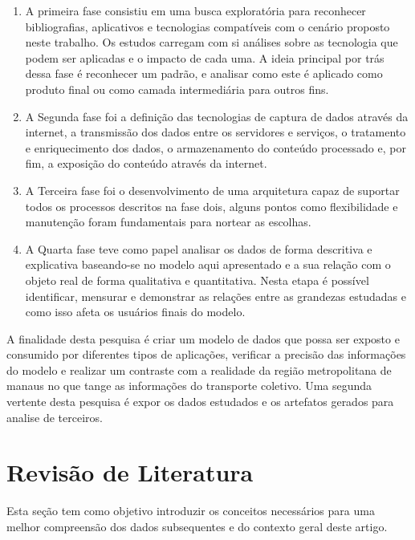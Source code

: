 \documentclass[12pt]{article}
\begin{document}
\begin{enumerate}
\item A primeira fase consistiu em uma busca exploratória para reconhecer bibliografias, aplicativos e tecnologias compatíveis com o cenário proposto neste trabalho. Os estudos carregam com si análises sobre as tecnologia que podem ser aplicadas e o impacto de cada uma. A ideia principal por trás dessa fase é reconhecer um padrão, e analisar como este é aplicado como produto final ou como camada intermediária para outros fins.\\

\item A Segunda fase foi a definição das tecnologias de captura de dados através da internet, a transmissão dos dados entre os servidores e serviços, o tratamento e enriquecimento dos dados, o armazenamento do conteúdo processado e, por fim, a exposição do conteúdo através da internet.\\

\item A Terceira fase foi o desenvolvimento de uma arquitetura capaz de suportar todos os processos descritos na fase dois, alguns pontos como flexibilidade e manutenção foram fundamentais para nortear as escolhas.\\

\item A Quarta fase teve como papel analisar os dados de forma descritiva e explicativa baseando-se no modelo aqui apresentado e a sua relação com o objeto real de forma qualitativa e quantitativa. Nesta etapa é possível identificar, mensurar e demonstrar as relações entre as grandezas estudadas e como isso afeta os usuários finais do modelo.\\
\end{enumerate}

A finalidade desta pesquisa é criar um modelo de dados que possa ser exposto e consumido por diferentes tipos de aplicações, verificar a precisão das informações do modelo e realizar um contraste com a realidade da região metropolitana de manaus no que tange as informações do transporte coletivo. Uma segunda vertente desta pesquisa é expor os dados estudados e os artefatos gerados para analise de terceiros.

\section{Revisão de Literatura}
Esta seção tem como objetivo introduzir os conceitos necessários para uma melhor compreensão dos dados subsequentes e do contexto geral deste artigo. 
\end{document}
